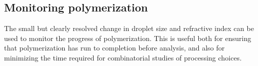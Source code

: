\documentclass[journal=langd5,manuscript=article,layout=twocolumn]{achemso}
\begin{document}


\subsection{Monitoring polymerization}
\label{sec:monitoring}

The small but clearly resolved 
change in droplet size and refractive index can be
used to monitor the progress of polymerization.
This is useful both for ensuring that polymerization has run
to completion before analysis, and also for minimizing the
time required for combinatorial studies of processing choices.

\end{document}
